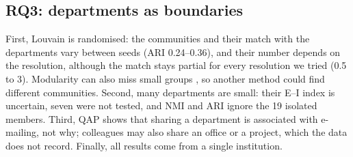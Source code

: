 \documentclass[12pt, a4paper]{article}
\begin{document}
\subsection{RQ3: departments as boundaries}
First, Louvain is randomised: the communities and their match with the
departments vary between seeds (ARI 0.24--0.36), and their number depends on
the resolution, although the match stays partial for every resolution we tried
(0.5 to 3). Modularity can also miss small groups \cite{fortunato2007}, so
another method could find different communities. Second, many departments are
small: their E--I index is uncertain, seven were not tested, and NMI and ARI
ignore the 19 isolated members. Third, QAP shows that sharing a department is
associated with e-mailing, not why; colleagues may also share an office or a
project, which the data does not record. Finally, all results come from a
single institution.
\end{document}
